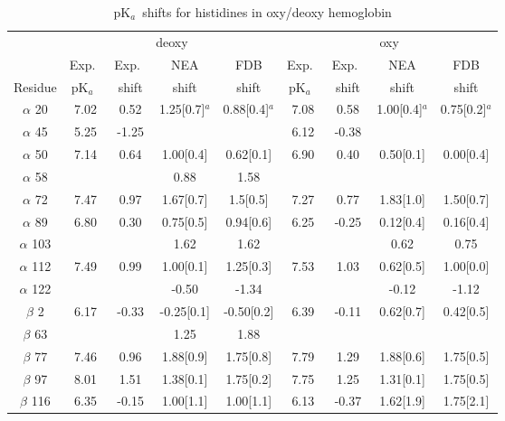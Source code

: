 \documentclass[a4paper,12pt]{article}
\newcommand{\pk}{pK$_a$}
\begin{document}
\begin{table}
\caption{\pk\ shifts for histidines in oxy/deoxy hemoglobin}\label{tab:hb}
\begin{center}
\begin{tabular}{ccccccccc} \hline
  & \multicolumn{4}{c}{\hrulefill deoxy \hrulefill} & \multicolumn{4}{c}{\hrulefill oxy \hrulefill} \\
            & Exp.\ & Exp.\ &  NEA       &   FDB       & Exp.\ & Exp.\ &    NEA      &    FDB      \\
Residue     & \pk\  & shift & shift      &  shift      & \pk\  & shift &   shift     &    shift    \\ \hline
$\alpha$  20 & 7.02 &  0.52 & 1.25[0.7]$^a$ & 0.88[0.4]$^a$ & 7.08 & 0.58 & 1.00[0.4]$^a$ & 0.75[0.2]$^a$ \\
$\alpha$  45 & 5.25 & -1.25 &            &             &  6.12 & -0.38 &             &             \\
$\alpha$  50 & 7.14 &  0.64 & 1.00[0.4]  &  0.62[0.1]  &  6.90 &  0.40 &  0.50[0.1]  &   0.00[0.4] \\
$\alpha$  58 &      &       & 0.88       &  1.58       &       &       &             &       	   \\
$\alpha$  72 & 7.47 &  0.97 & 1.67[0.7]  &  1.5[0.5]   &  7.27 &  0.77 &  1.83[1.0]  &   1.50[0.7] \\
$\alpha$  89 & 6.80 &  0.30 & 0.75[0.5]  &  0.94[0.6]  &  6.25 & -0.25 &  0.12[0.4]  &   0.16[0.4] \\
$\alpha$ 103 &      &       & 1.62       &  1.62       &       &       &  0.62       &   0.75      \\
$\alpha$ 112 & 7.49 &  0.99 & 1.00[0.1]  &  1.25[0.3]  &  7.53 &  1.03 &  0.62[0.5]  &   1.00[0.0] \\
$\alpha$ 122 &      &       &-0.50       & -1.34       &       &       & -0.12       &  -1.12      \\
$\beta$    2 & 6.17 & -0.33 &-0.25[0.1]  & -0.50[0.2]  &  6.39 & -0.11 &  0.62[0.7]  &   0.42[0.5] \\
$\beta$   63 &      &       & 1.25       &  1.88       &       &       &             &             \\
$\beta$   77 & 7.46 &  0.96 & 1.88[0.9]  &  1.75[0.8]  &  7.79 &  1.29 &  1.88[0.6]  &   1.75[0.5] \\
$\beta$   97 & 8.01 &  1.51 & 1.38[0.1]  &  1.75[0.2]  &  7.75 &  1.25 &  1.31[0.1]  &   1.75[0.5] \\
$\beta$  116 & 6.35 & -0.15 & 1.00[1.1]  &  1.00[1.1]  &  6.13 & -0.37 &  1.62[1.9]  &   1.75[2.1] \\

\end{tabular}
\end{center}
\end{table}
\end{document}
